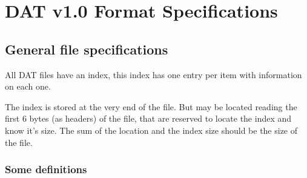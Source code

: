 \documentclass{article}
\begin{document}
\section{DAT v1.0 Format Specifications}

\subsection{General file specifications}
 All DAT files have an index, this index has one entry per item with information on each one.

 The index is stored at the very end of the file. But may be located reading the first 6 bytes (as headers) of the file,
 that are reserved to locate the index and know it's size. The sum of the location and the index size should be the size of the file.
 
\subsubsection{Some definitions}
\end{document}
